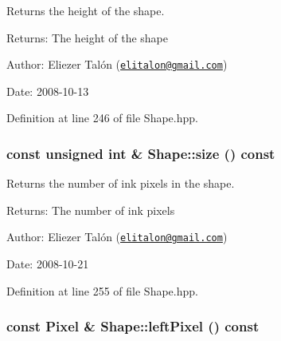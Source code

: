 Returns the height of the shape. 

\begin{Desc}
\item[Returns:]The height of the shape\end{Desc}
\begin{Desc}
\item[Author:]Eliezer Talón (\href{mailto:elitalon@gmail.com}{\tt elitalon@gmail.com}) \end{Desc}
\begin{Desc}
\item[Date:]2008-10-13 \end{Desc}


Definition at line 246 of file Shape.hpp.\hypertarget{class_shape_8504d3be338d2fa594c35fe1444a9ed8}{
\subsubsection[size]{\setlength{\rightskip}{0pt plus 5cm}const unsigned int \& Shape::size () const}}
\label{class_shape_8504d3be338d2fa594c35fe1444a9ed8}


Returns the number of ink pixels in the shape. 

\begin{Desc}
\item[Returns:]The number of ink pixels\end{Desc}
\begin{Desc}
\item[Author:]Eliezer Talón (\href{mailto:elitalon@gmail.com}{\tt elitalon@gmail.com}) \end{Desc}
\begin{Desc}
\item[Date:]2008-10-21 \end{Desc}


Definition at line 255 of file Shape.hpp.\hypertarget{class_shape_53d49d362234068aad0b80986fabb85d}{
\subsubsection[leftPixel]{\setlength{\rightskip}{0pt plus 5cm}const {\bf Pixel} \& Shape::leftPixel () const}}
\label{class_shape_53d49d362234068aad0b80986fabb85d}


